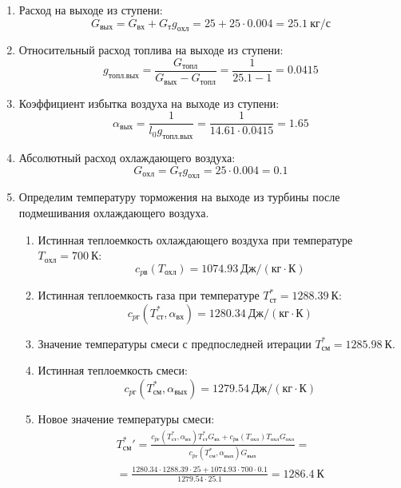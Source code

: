 \documentclass[a4paper,10pt]{article}
\begin{document}
\begin{enumerate}
        \item Расход на выходе из ступени:
        \[
            G_{вых} = G_{вх} + G_т g_{охл} =
                25 + 25 \cdot
                0.004 =
            25.1 \ кг/с
        \]

        \item Относительный расход топлива на выходе из ступени:
        \[
            g_{топл.вых} = \frac{ G_{топл} }{ G_{вых} - G_{топл} } =
                 \frac{ 1 }{ 25.1 - 1 } =
            0.0415
        \]

        \item Коэффициент избытка воздуха на выходе из ступени:
        \[
            \alpha_{вых} = \frac{ 1 }{ l_0 g_{топл.вых} } =
                \frac{ 1 }{ 14.61 \cdot 0.0415 } =
            1.65
        \]

        \item Абсолютный расход охлаждающего воздуха:
        \[
            G_{охл} = G_т g_{охл} = 25 \cdot 0.004 =
            0.1
        \]

        \item Определим температуру торможения на выходе из турбины после подмешивания охлаждающего воздуха.
        \begin{enumerate}

            \item Истинная теплоемкость охлаждающего воздуха при температуре $T_{охл} = 700\ К $:
            \[
                c_{pв} (T_{охл}) = 1074.93\ Дж/ (кг \cdot К)
            \]

            \item Истинная теплоемкость газа при температуре $T_{ст}^* = 1288.39 \ К $:
            \[
                c_{pг} (T_{ст}^*, \alpha_{вх}) =
                1280.34\ Дж/ (кг \cdot К)
            \]

            \item Значение температуры смеси с предпоследней итерации $T_{см}^{*} = 1285.98\ К$.

            \item Истинная теплоемкость смеси:
            \[
                c_{pг} (T_{см}^{*}, \alpha_{вых}) =
                1279.54\ Дж/ (кг \cdot К)
            \]

            \item Новое значение температуры смеси:
            \begin{gather*}
                T_{см}^*\prime = \frac{
                        c_{pг} (T_{ст}^*, \alpha_{вх}) T_{ст}^* G_{вх} + c_{pв} (T_{охл}) T_{охл} G_{охл}
                    }{
                        c_{pг} (T_{см}^{*}, \alpha_{вых}) G_{вых}
                    } =\\
                = \frac{
                    1280.34
                    \cdot 1288.39 \cdot 25 +
                    1074.93
                    \cdot 700 \cdot 0.1
                }{
                    1279.54
                    \cdot  25.1
                } =
                1286.4\ К\\
            \end{gather*}


\end{enumerate}
\end{enumerate}
\end{document}

